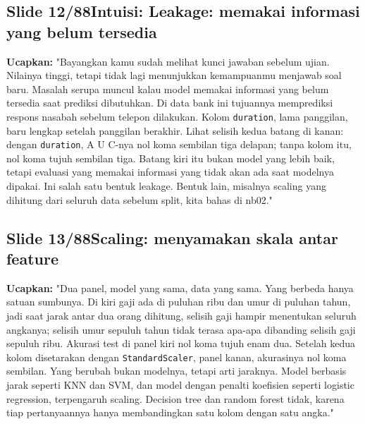 \documentclass[11pt]{article}
\renewcommand{\framebox}[1]{\colorbox{acc!15}{\textcolor{acc}{\textbf{#1}}}}
\begin{document}
\subsection*{\framebox{Slide 12/88}\quad Intuisi: Leakage: memakai informasi yang belum tersedia}
\textbf{Ucapkan:} "Bayangkan kamu sudah melihat kunci jawaban sebelum ujian. Nilainya tinggi, tetapi tidak lagi menunjukkan kemampuanmu menjawab soal baru. Masalah serupa muncul kalau model memakai informasi yang belum tersedia saat prediksi dibutuhkan. Di data bank ini tujuannya memprediksi respons nasabah sebelum telepon dilakukan. Kolom \texttt{duration}, lama panggilan, baru lengkap setelah panggilan berakhir. Lihat selisih kedua batang di kanan: dengan \texttt{duration}, A U C-nya nol koma sembilan tiga delapan; tanpa kolom itu, nol koma tujuh sembilan tiga. Batang kiri itu bukan model yang lebih baik, tetapi evaluasi yang memakai informasi yang tidak akan ada saat modelnya dipakai. Ini salah satu bentuk leakage. Bentuk lain, misalnya scaling yang dihitung dari seluruh data sebelum split, kita bahas di nb02."\\[2pt]

\subsection*{\framebox{Slide 13/88}\quad Scaling: menyamakan skala antar feature}
\textbf{Ucapkan:} "Dua panel, model yang sama, data yang sama. Yang berbeda hanya satuan sumbunya. Di kiri gaji ada di puluhan ribu dan umur di puluhan tahun, jadi saat jarak antar dua orang dihitung, selisih gaji hampir menentukan seluruh angkanya; selisih umur sepuluh tahun tidak terasa apa-apa dibanding selisih gaji sepuluh ribu. Akurasi test di panel kiri nol koma tujuh enam dua. Setelah kedua kolom disetarakan dengan \texttt{StandardScaler}, panel kanan, akurasinya nol koma sembilan. Yang berubah bukan modelnya, tetapi arti jaraknya. Model berbasis jarak seperti KNN dan SVM, dan model dengan penalti koefisien seperti logistic regression, terpengaruh scaling. Decision tree dan random forest tidak, karena tiap pertanyaannya hanya membandingkan satu kolom dengan satu angka."\\[2pt]
\end{document}
